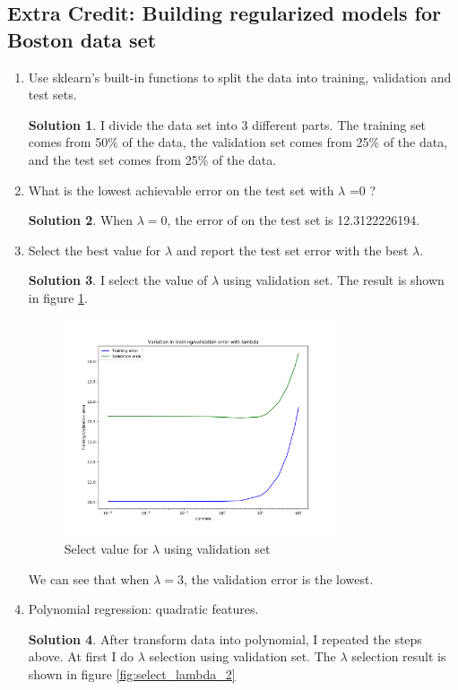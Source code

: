 \documentclass[]{book}
\theoremstyle{definition}
\newtheorem*{soln}{Solution}
\begin{document}
\subsection*{Extra Credit: Building regularized models for Boston data set}
\begin{enumerate}
	\item Use sklearn's built-in functions to split the data into training, validation and test sets. 
	\begin{soln}
		I divide the data set into 3 different parts. The training set comes from 50\% of the data, the validation set comes from 25\% of the data, and the test set comes from 25\% of the data.
	\end{soln}
	\item What is the lowest achievable error on the test set with  $\lambda$ =0  ?
	\begin{soln}
		When $\lambda = 0$, the error of on the test set is 12.3122226194.
	\end{soln}
	\item Select the best value for  $\lambda$  and report the test set error with the best $\lambda$.
	\begin{soln}
		I select the value of $\lambda$ using validation set. The result is shown in figure \ref{fig:select_lambda_1}.
		\begin{figure}[H]
			\centering
			\includegraphics[width=8cm]{imgs//select_lambda_1.pdf}
			\caption{Select value for $\lambda$ using validation set}
			\label{fig:select_lambda_1}
		\end{figure}
	We can see that when $\lambda = 3$, the validation error is the lowest.
	\end{soln}
	\item Polynomial regression: quadratic features.
	\begin{soln}
		After transform data into polynomial, I repeated the steps above. At first I do $\lambda$ selection using validation set. The $\lambda$ selection result is shown in figure \ref{fig:select_lambda_2}

\end{soln}
\end{enumerate}
\end{document}
